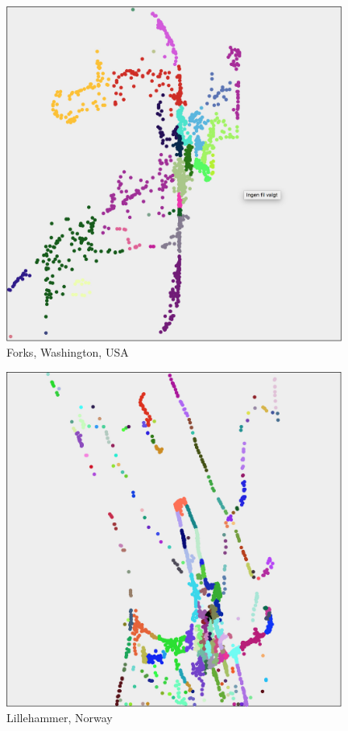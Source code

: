 \begin{appendices}
	\begin{figure}[H]
		\centering
		\includegraphics[width=11cm]{Images/computations/KMEANSForks.jpg}
		\caption{Forks, Washington, USA}
	\end{figure}

	\begin{figure}
		\centering
		\includegraphics[width=11cm]{Images/computations/KMEANSLillehammer.jpg}
		\caption{Lillehammer, Norway}
	\end{figure}


\end{appendices}

